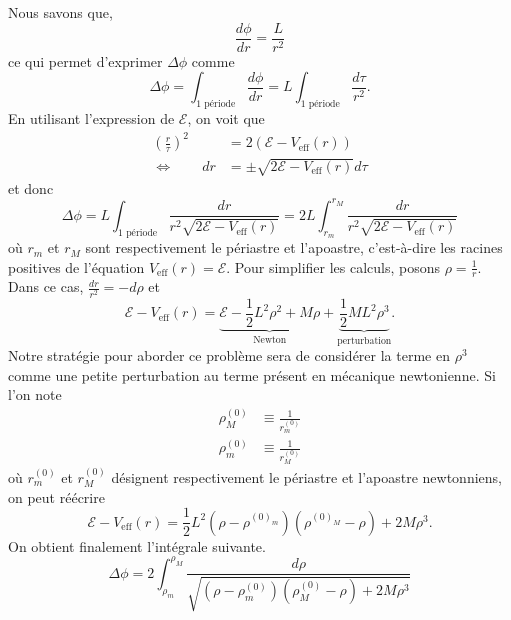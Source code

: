 \documentclass[a4paper,11pt]{report}
\theoremstyle{definition}
\theoremstyle{plain}
\theoremstyle{definition}
\theoremstyle{remark}
\begin{document}
        Nous savons que, 
        \begin{equation}
            \frac{d\phi}{dr} = \frac{L}{r^2}
        \end{equation}
        ce qui permet d'exprimer $\Delta\phi$ comme
        \begin{equation}
            \Delta\phi = \int_{\text{1 période}}\frac{d\phi}{dr} = L\int_{\text{1 période}}\frac{d\tau}{r^2}.
        \end{equation}
        En utilisant l'expression de $\mathscr{E}$, on voit que
        \begin{align}
            \left( \frac{r}{\tau} \right)^2 &= 2(\mathscr{E}-V_{\text{eff}}(r))\\
            \Leftrightarrow\qquad dr &= \pm\sqrt{2\mathscr{E}-V_{\text{eff}}(r)}d\tau
        \end{align}
        et donc
        \begin{equation}
            \Delta\phi = L\int_{\text{1 période}}\frac{dr}{r^2\sqrt{2\mathscr{E}-V_{\text{eff}}(r)}} = 2L\int_{r_m}^{r_M}\frac{dr}{r^2\sqrt{2\mathscr{E}-V_{\text{eff}}(r)}}
        \end{equation}
        où $r_m$ et $r_M$ sont respectivement le périastre et l'apoastre, c'est-à-dire les racines positives de l'équation $V_{\text{eff}}(r)=\mathscr{E}$. Pour simplifier les calculs, posons $\rho=\frac{1}{r}$. Dans ce cas, $\frac{dr}{r^2} = -d\rho$ et 
        \begin{equation}
            \mathscr{E}-V_{\text{eff}}(r) = \underbrace{\mathscr{E}-\frac{1}{2}L^2\rho^2+M\rho}_{\text{Newton}}+\underbrace{\frac{1}{2}ML^2\rho^3}_{\text{perturbation}}.
        \end{equation}
        Notre stratégie pour aborder ce problème sera de considérer la terme en $\rho^3$ comme une petite perturbation au terme présent en mécanique newtonienne. Si l'on note
        \begin{align}
            \rho^{(0)}_M &\equiv \frac{1}{r^{(0)}_m}\\
            \rho^{(0)}_m &\equiv \frac{1}{r^{(0)}_M}
        \end{align}
        où $r^{(0)}_m$ et $r^{(0)}_M$ désignent respectivement le périastre et l'apoastre newtonniens, on peut réécrire
        \begin{equation}
            \mathscr{E}-V_{\text{eff}}(r) = \frac{1}{2}L^2\left( \rho-\rho^{(0)_m} \right)\left( \rho^{(0)_M}-\rho \right)+2M\rho^3.
        \end{equation}
        On obtient finalement l'intégrale suivante.
        \begin{equation}
            \Delta\phi = 2\int^{\rho_M}_{\rho_m}\frac{d\rho}{\sqrt{\left( \rho-\rho^{(0)}_m \right)\left( \rho^{(0)}_M-\rho \right)+2M\rho^3}}
        \end{equation}
        
\end{document}
